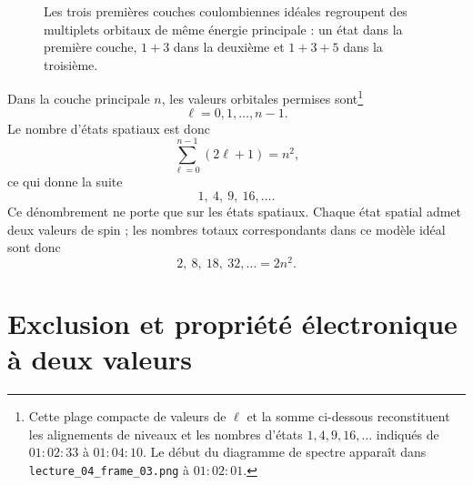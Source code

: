 \begin{figure}[htbp]
\centering
{}
\caption{Les trois premières couches coulombiennes idéales regroupent des multiplets orbitaux de même énergie principale : un état dans la première couche, \(1+3\) dans la deuxième et \(1+3+5\) dans la troisième.}
\end{figure}

Dans la couche principale \(n\), les valeurs orbitales permises sont\footnote{Cette plage compacte de valeurs de \(\ell\) et la somme ci-dessous reconstituent les alignements de niveaux et les nombres d’états \(1,4,9,16,\ldots\) indiqués de \(01{:}02{:}33\) à \(01{:}04{:}10\). Le début du diagramme de spectre apparaît dans \texttt{lecture\_04\_frame\_03.png} à \(01{:}02{:}01\).}
\[
\ell=0,1,\ldots,n-1.
\]
Le nombre d’états spatiaux est donc
\begin{equation}
\sum_{\ell=0}^{n-1}(2\ell+1)=n^{2},
\end{equation}
ce qui donne la suite
\begin{equation}
1,\ 4,\ 9,\ 16,\ldots .
\end{equation}
Ce dénombrement ne porte que sur les états spatiaux. Chaque état spatial admet deux valeurs de spin ; les nombres totaux correspondants dans ce modèle idéal sont donc
\begin{equation}
2,\ 8,\ 18,\ 32,\ldots=2n^{2}.
\end{equation}

\section{Exclusion et propriété électronique à deux valeurs}

